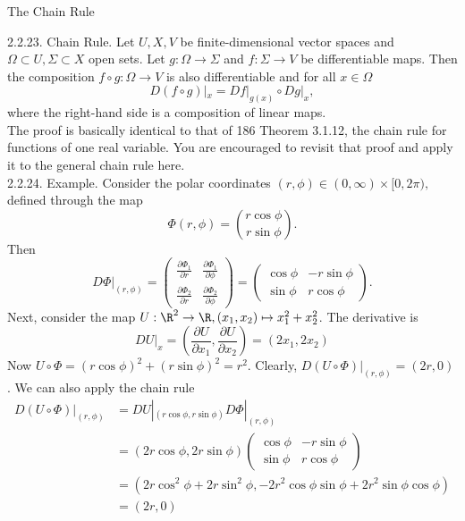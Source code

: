 \documentclass[smaller,hyperref={CJKbookmarks=true}]{beamer}
\begin{document}
\begin{frame}{The Chain Rule}
\begin{spacing}{1}
\alert{2.2.23. Chain Rule.} Let $U,X,V$ be finite-dimensional vector spaces and $\Omega\subset U,\Sigma\subset X$ open sets. Let $g:\Omega\to\Sigma$ and $f:\Sigma\to V$ be dif{}ferentiable maps. Then the composition $f\circ g:\Omega\to V$ is also dif{}ferentiable and for all $x\in\Omega$
\begin{equation}\label{2.2.4}
  D(f\circ g)|_x=Df|_{g(x)}\circ Dg|_x,
\end{equation}
where the right-hand side is a composition of linear maps.\\[5pt]
The proof is basically identical to that of 186 Theorem 3.1.12, the chain
rule for functions of one real variable. You are encouraged to revisit that
proof and apply it to the general chain rule here.\\[4pt]
\alert{2.2.24. Example.} Consider the polar coordinates $(r,\phi)\in(0,\infty)\times[0,2\pi),$ defined through the map
\[\Phi(r,\phi)=\binom{r\cos\phi}{r\sin\phi}.\]
\newpage
Then
\[D\Phi|_{(r,\phi)}=\begin{pmatrix}
                      \frac{\partial\Phi_1}{\partial r} & \frac{\partial\Phi_1}{\partial \phi} \\
                      \frac{\partial\Phi_2}{\partial r} & \frac{\partial\Phi_2}{\partial \phi}
                    \end{pmatrix}=\begin{pmatrix}
                                    \cos\phi & -r\sin\phi \\
                                    \sin\phi & r\cos\phi
                                  \end{pmatrix}.\]
Next, consider the map $U:\R^2\to\R,(x_1,x_2)\mapsto x_1^2+x_2^2$. The derivative is
\[DU|_x=\left(\frac{\partial U}{\partial x_1},\frac{\partial U}{\partial x_2}\right)=(2x_1,2x_2)\]
Now $U\circ\Phi=(r\cos\phi)^2+(r\sin\phi)^2=r^2$. Clearly, $D(U\circ\Phi)|_{(r,\phi)}=(2r,0)$. We can also apply the chain rule
\begin{equation*}
  \begin{split}
     D(U\circ\Phi)|_{(r,\phi)} &=DU|_{(r\cos\phi,r\sin\phi)}D\Phi|_{(r,\phi)} \\
       &=(2r\cos\phi,2r\sin\phi)\begin{pmatrix}
                                  \cos\phi & -r\sin\phi \\
                                  \sin\phi & r\cos\phi
                                \end{pmatrix} \\
       &=(2r\cos^2\phi+2r\sin^2\phi,-2r^2\cos\phi\sin\phi+2r^2\sin\phi\cos\phi)  \\
       &=(2r,0)
  \end{split}
\end{equation*}
\end{spacing}
\end{frame}
\end{document}
